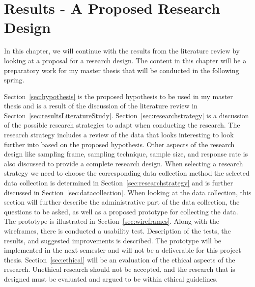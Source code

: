 \chapter{Results - A Proposed Research Design}
  \label{chapter:researchDesign}

  In this chapter, we will continue with the results from the literature review by looking at a proposal for a research design. The content in this chapter will be a preparatory work for my master thesis that will be conducted in the following spring.

  Section~\ref{sec:hypothesis} is the proposed hypothesis to be used in my master thesis and is a result of the discussion of the literature review in Section~\ref{sec:resultsLiteratureStudy}. Section~\ref{sec:researchstrategy} is a discussion of the possible research strategies to adapt when conducting the research. The research strategy includes a review of the data that looks interesting to look further into based on the proposed hypothesis. Other aspects of the research design like sampling frame, sampling technique, sample size, and response rate is also discussed to provide a complete research design. When selecting a research strategy we need to choose the corresponding data collection method the selected data collection is determined in Section~\ref{sec:researchstrategy} and is further discussed in Section~\ref{sec:datacollection}. When looking at the data collection, this section will further describe the administrative part of the data collection, the questions to be asked, as well as a proposed prototype for collecting the data. The prototype is illustrated in Section~\ref{sec:wireframes}. Along with the wireframes, there is conducted a usability test. Description of the tests, the results, and suggested improvements is described. The prototype will be implemented in the next semester and will not be a deliverable for this project thesis. Section~\ref{sec:ethical} will be an evaluation of the ethical aspects of the research. Unethical research should not be accepted, and the research that is designed must be evaluated and argued to be within ethical guidelines.


  
   

 

  

      
